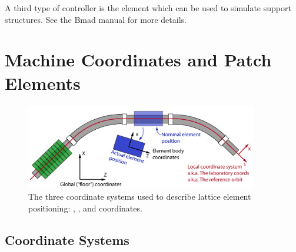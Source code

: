 \documentclass{hitec}
\newcommand{\Section}[1]{\section{#1}\vspace*{-1ex}}
\begin{document}
A third type of controller is the  element which can be used to simulate support
structures. See the Bmad manual for more details.

\newpage

\Section{Machine Coordinates and Patch Elements}


\begin{figure}[tb]
  \centering
  \includegraphics[width=0.9\textwidth]{coordinates.pdf}
  \caption{The three coordinate systems used to describe lattice element positioning:
, , and  coordinates.}
  \label{f:coordinates}
\end{figure}

\subsection{Coordinate Systems}
\end{document}
